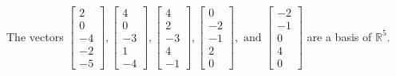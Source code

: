 \begin{exercise}
\begin{exerciseStatement}
  \end{exerciseStatement}
  \begin{exerciseAnswer}
   The vectors \(\left[\begin{array}{r}
2 \\
0 \\
-4 \\
-2 \\
-5
\end{array}\right] , \left[\begin{array}{r}
4 \\
0 \\
-3 \\
1 \\
-4
\end{array}\right] , \left[\begin{array}{r}
4 \\
2 \\
-3 \\
4 \\
-1
\end{array}\right] , \left[\begin{array}{r}
0 \\
-2 \\
-1 \\
2 \\
0
\end{array}\right] , \text{ and } \left[\begin{array}{r}
-2 \\
-1 \\
0 \\
4 \\
0
\end{array}\right]\) 
  	 are  a basis of \(\mathbb{R}^5\).
  


  \end{exerciseAnswer}
\end{exercise}